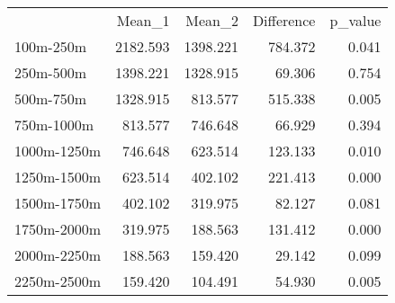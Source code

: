 

\centering
\begin{tabular}{lllll}
\cline{1-5}
\multicolumn{1}{c}{} &
  \multicolumn{1}{|r}{Mean\_1} &
  \multicolumn{1}{r}{Mean\_2} &
  \multicolumn{1}{r}{Difference} &
  \multicolumn{1}{r}{p\_value} \\
\cline{1-5}
\multicolumn{1}{l}{100m-250m} &
  \multicolumn{1}{|r}{2182.593} &
  \multicolumn{1}{r}{1398.221} &
  \multicolumn{1}{r}{784.372} &
  \multicolumn{1}{r}{0.041} \\
\multicolumn{1}{l}{250m-500m} &
  \multicolumn{1}{|r}{1398.221} &
  \multicolumn{1}{r}{1328.915} &
  \multicolumn{1}{r}{69.306} &
  \multicolumn{1}{r}{0.754} \\
\multicolumn{1}{l}{500m-750m} &
  \multicolumn{1}{|r}{1328.915} &
  \multicolumn{1}{r}{813.577} &
  \multicolumn{1}{r}{515.338} &
  \multicolumn{1}{r}{0.005} \\
\multicolumn{1}{l}{750m-1000m} &
  \multicolumn{1}{|r}{813.577} &
  \multicolumn{1}{r}{746.648} &
  \multicolumn{1}{r}{66.929} &
  \multicolumn{1}{r}{0.394} \\
\multicolumn{1}{l}{1000m-1250m} &
  \multicolumn{1}{|r}{746.648} &
  \multicolumn{1}{r}{623.514} &
  \multicolumn{1}{r}{123.133} &
  \multicolumn{1}{r}{0.010} \\
\multicolumn{1}{l}{1250m-1500m} &
  \multicolumn{1}{|r}{623.514} &
  \multicolumn{1}{r}{402.102} &
  \multicolumn{1}{r}{221.413} &
  \multicolumn{1}{r}{0.000} \\
\multicolumn{1}{l}{1500m-1750m} &
  \multicolumn{1}{|r}{402.102} &
  \multicolumn{1}{r}{319.975} &
  \multicolumn{1}{r}{82.127} &
  \multicolumn{1}{r}{0.081} \\
\multicolumn{1}{l}{1750m-2000m} &
  \multicolumn{1}{|r}{319.975} &
  \multicolumn{1}{r}{188.563} &
  \multicolumn{1}{r}{131.412} &
  \multicolumn{1}{r}{0.000} \\
\multicolumn{1}{l}{2000m-2250m} &
  \multicolumn{1}{|r}{188.563} &
  \multicolumn{1}{r}{159.420} &
  \multicolumn{1}{r}{29.142} &
  \multicolumn{1}{r}{0.099} \\
\multicolumn{1}{l}{2250m-2500m} &
  \multicolumn{1}{|r}{159.420} &
  \multicolumn{1}{r}{104.491} &
  \multicolumn{1}{r}{54.930} &
  \multicolumn{1}{r}{0.005} \\
\cline{1-5}
\end{tabular}



